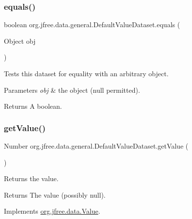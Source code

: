 \subsubsection{\texorpdfstring{equals()}{equals()}}
{\footnotesize\ttfamily boolean org.\+jfree.\+data.\+general.\+Default\+Value\+Dataset.\+equals (\begin{DoxyParamCaption}\item[{Object}]{obj }\end{DoxyParamCaption})}

Tests this dataset for equality with an arbitrary object.


\begin{DoxyParams}{Parameters}
{\em obj} & the object ({\ttfamily null} permitted).\\
\hline
\end{DoxyParams}
\begin{DoxyReturn}{Returns}
A boolean. 
\end{DoxyReturn}
\mbox{\label{classorg_1_1jfree_1_1data_1_1general_1_1_default_value_dataset_ab27ab5fa97b9cadbb6df5c039688ab69}} 
\subsubsection{\texorpdfstring{get\+Value()}{getValue()}}
{\footnotesize\ttfamily Number org.\+jfree.\+data.\+general.\+Default\+Value\+Dataset.\+get\+Value (\begin{DoxyParamCaption}{ }\end{DoxyParamCaption})}

Returns the value.

\begin{DoxyReturn}{Returns}
The value (possibly {\ttfamily null}). 
\end{DoxyReturn}


Implements \mbox{\hyperlink{interfaceorg_1_1jfree_1_1data_1_1_value_a70e7f25d71cbb7eb0cdad970adcfe4b9}{org.\+jfree.\+data.\+Value}}.

\mbox{\label{classorg_1_1jfree_1_1data_1_1general_1_1_default_value_dataset_a1cc7d03beaf9ef8cc0ccba04b7bcadb2}} 
